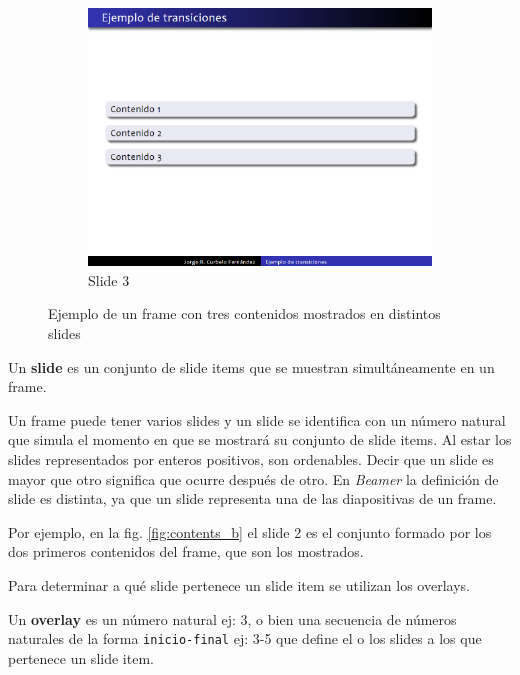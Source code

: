 \begin{figure}[tb]
\begin{subfigure}[b]{0.3\textwidth}
 				\includegraphics[width=\textwidth]{img/content3}
 				\caption{Slide 3}
 				\label{fig:contents_c}	
 			\end{subfigure}	 			
 			\caption{Ejemplo de un frame con tres contenidos mostrados en distintos slides}
 			\label{fig:contents} 
 		\end{figure}

 		\begin{definition}
 		\label{def:slide}
 			Un \textbf{slide} es un conjunto de slide items que se muestran simultáneamente en un frame.
 		\end{definition}
		
		Un frame puede tener varios slides y un slide se identifica con un número natural que simula el momento en que se mostrará su conjunto de slide items. Al estar los slides representados por enteros positivos, son ordenables. Decir que un slide es mayor que otro significa que ocurre después de otro. En \textit{Beamer} la definición de slide es distinta, ya que un slide representa una de las diapositivas de un frame.

		Por ejemplo, en la fig. \ref{fig:contents_b} el slide 2 es el conjunto formado por los dos primeros contenidos del frame, que son los mostrados. 

		Para determinar a qué slide pertenece un slide item se utilizan los overlays.				

 		\begin{definition}
 		\label{def:overlay}
 			Un \textbf{overlay} es un número natural ej: 3, o bien una secuencia de números naturales de la forma \texttt{inicio-final} ej: 3-5 que define el o los slides a los que pertenece un slide item.
 		\end{definition}


